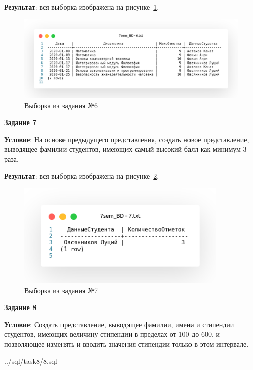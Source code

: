\textbf{Результат}: вся выборка изображена на рисунке~\ref{fig:t6}.

\begin{figure}[!h]
  \centering

  \includegraphics[width=18cm]
  {../sql/task6/6.png}

  \caption{Выборка из задания №6}

  \label{fig:t6}
\end{figure}

\newpage

\begin{center}
  \textbf{Задание 7}
\end{center}

\textbf{Условие}:
На основе предыдущего представления, создать новое представление, выводящее фамилии студентов,
имеющих самый высокий балл как минимум 3 раза.



\textbf{Результат}: вся выборка изображена на рисунке~\ref{fig:t7}.

\begin{figure}[!h]
  \centering

  \includegraphics[height=5cm]
  {../sql/task7/7.png}

  \caption{Выборка из задания №7}

  \label{fig:t7}
\end{figure}

\newpage

\begin{center}
  \textbf{Задание 8}
\end{center}

\textbf{Условие}:
Создать представление, выводящее фамилии, имена и стипендии студентов,
имеющих величину стипендии в пределах от 100 до 600,
и позволяющее изменять и вводить значения стипендии только в этом интервале. 


{../sql/task8/8.sql}
